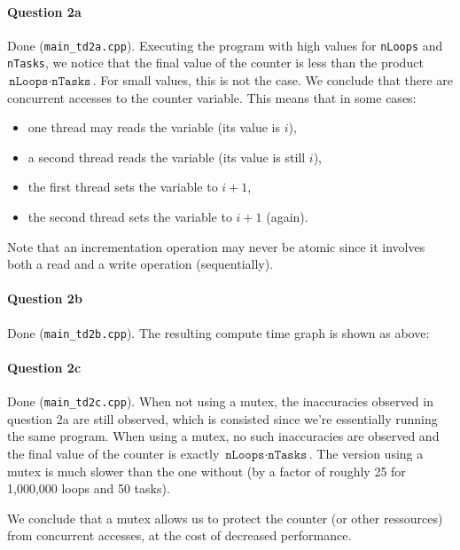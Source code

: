 \documentclass[a4paper,oneside,11pt]{article}
\begin{document}
\paragraph{Question 2a} Done (\texttt{main\_td2a.cpp}). Executing the program with high values for \texttt{nLoops} and \texttt{nTasks}, we notice that the final value of the counter is less than the product $\texttt{nLoops}\cdot\texttt{nTasks}$. For small values, this is not the case. We conclude that there are concurrent accesses to the counter variable. This means that in some cases:
\begin{itemize}
  \item  one thread may reads the variable (its value is $i$),
  \item a second thread reads the variable (its value is still $i$),
  \item the first thread sets the variable to $i+1$,
  \item the second thread sets the variable to $i+1$ (again).
\end{itemize}

Note that an incrementation operation may never be atomic since it involves both a read and a write operation (sequentially).

\paragraph{Question 2b} Done (\texttt{main\_td2b.cpp}). The resulting compute time graph is shown as above:

\begin{figure}[H]
\end{figure}

\paragraph{Question 2c} Done (\texttt{main\_td2c.cpp}). When not using a mutex, the inaccuracies observed in question 2a are still observed, which is consisted since we're essentially running the same program. When using a mutex, no such inaccuracies are observed and the final value of the counter is exactly $\texttt{nLoops}\cdot\texttt{nTasks}$. The version using a mutex is much slower than the one without (by a factor of roughly 25 for 1,000,000 loops and 50 tasks).

We conclude that a mutex allows us to protect the counter (or other ressources) from concurrent accesses, at the cost of decreased performance.
\end{document}

